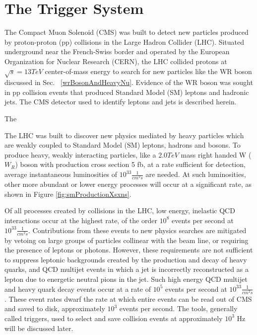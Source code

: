 \section{The Trigger System}
\label{sec:triggerDescription}




The Compact Muon Solenoid (CMS) was built to detect new particles produced by proton-proton (pp) collisions 
in the Large Hadron Collider (LHC).  Situated underground near the French-Swiss border and
operated by the European Organization for Nuclear Research (CERN), the LHC collided protons at
$\sqrt{s} = 13 TeV$ center-of-mass energy to search for new particles like the WR boson discussed 
in Sec. ~\ref{wrBosonAndHeavyNu}.  Evidence of the WR boson was sought in pp collision events that
produced Standard Model (SM) leptons and hadronic jets.  The CMS detector used to identify leptons and
jets is described herein.

The

The LHC was built to discover new physics mediated by heavy particles which are weakly coupled to Standard Model (SM)
leptons, hadrons and bosons.  To produce heavy, weakly interacting particles, like a $2.0 TeV$ mass right handed W ($W_{R}$) boson
with production cross section 5 fb, at a rate sufficient for detection, average instantaneous luminosities of
$10^{33} \frac{1}{cm^{2}s}$ are needed.  At such luminosities, other more abundant or lower energy processes will occur
at a significant rate, as shown in Figure \ref{fig:smProductionXsxns}.

Of all processes created by collisions in the LHC, low energy, inelastic QCD interactions occur at the highest rate, of the order
$10^{8}$ events per second at $10^{33} \frac{1}{cm^{2}s}$.  Contributions from these events to new physics searches are mitigated by vetoing
on large groups of particles collinear with the beam line, or requiring the presence of leptons or photons.  However, these
requirements are not sufficient to suppress leptonic backgrounds created by the production and decay of heavy quarks, and QCD multijet
events in which a jet is incorrectly reconstructed as a lepton due to energetic neutral pions in the jet.  Such high energy QCD multijet
and heavy quark decay events occur at a rate of $10^{5}$ events per second at $10^{33} \frac{1}{cm^{2}s}$.  These event rates dwarf
the rate at which entire events can be read out of CMS and saved to disk, approximately $10^{3}$ events per second.  The tools, generally
called triggers, used to select and save collision events at approximately $10^{3}$ Hz will be discussed later.

